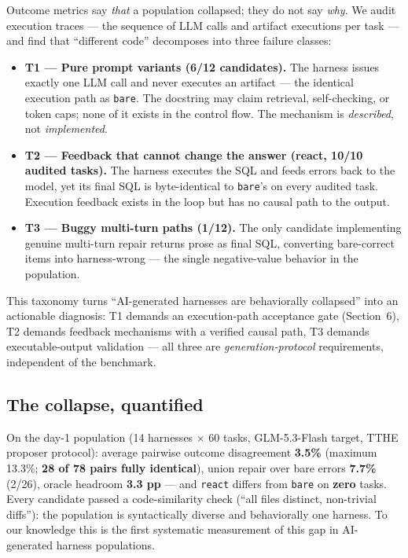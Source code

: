 Outcome metrics say \emph{that} a population collapsed; they do not say
\emph{why}. We audit execution traces --- the sequence of LLM calls and
artifact executions per task --- and find that ``different code''
decomposes into three failure classes:
\begin{itemize}
\tightlist
\item
  \textbf{T1 --- Pure prompt variants (6/12 candidates).} The harness
  issues exactly one LLM call and never executes an artifact --- the
  identical execution path as \texttt{bare}. The docstring may claim
  retrieval, self-checking, or token caps; none of it exists in the
  control flow. The mechanism is \emph{described}, not
  \emph{implemented}.
\item
  \textbf{T2 --- Feedback that cannot change the answer (react, 10/10
  audited tasks).} The harness executes the SQL and feeds errors back to
  the model, yet its final SQL is byte-identical to \texttt{bare}'s on
  every audited task. Execution feedback exists in the loop but has no
  causal path to the output.
\item
  \textbf{T3 --- Buggy multi-turn paths (1/12).} The only candidate
  implementing genuine multi-turn repair returns prose as final SQL,
  converting bare-correct items into harness-wrong --- the single
  negative-value behavior in the population.
\end{itemize}
This taxonomy turns ``AI-generated harnesses are behaviorally
collapsed'' into an actionable diagnosis: T1 demands an execution-path
acceptance gate (Section~6), T2 demands feedback mechanisms with a verified
causal path, T3 demands executable-output validation --- all three are
\emph{generation-protocol} requirements, independent of the benchmark.
\subsection{The collapse, quantified}\label{the-collapse-quantified}
On the day-1 population (14 harnesses × 60 tasks, GLM-5.3-Flash target,
TTHE proposer protocol): average pairwise outcome disagreement
\textbf{3.5\%} (maximum 13.3\%; \textbf{28 of 78 pairs fully
identical}), union repair over bare errors \textbf{7.7\%} (2/26), oracle
headroom \textbf{3.3 pp} --- and \texttt{react} differs from
\texttt{bare} on \textbf{zero} tasks. Every candidate passed a
code-similarity check (``all files distinct, non-trivial diffs''): the
population is syntactically diverse and behaviorally one harness. To our
knowledge this is the first systematic measurement of this gap in
AI-generated harness populations.
